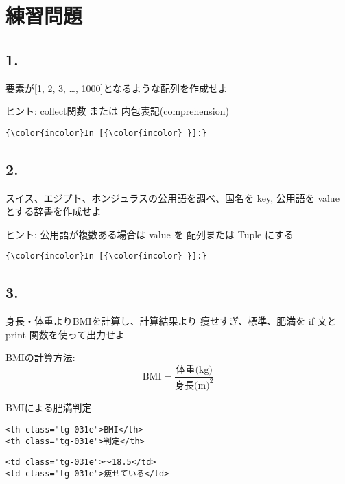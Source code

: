 \documentclass[a4paper,dvipdfmx,uplatex]{jsarticle}
\begin{document}
    \section{練習問題}\label{ux7df4ux7fd2ux554fux984c}

    \subsection{1.}\label{section}

要素が{[}1, 2, 3, \ldots{}, 1000{]}となるような配列を作成せよ

ヒント: collect関数 または 内包表記(comprehension)

    \begin{Verbatim}[commandchars=\\\{\}]
{\color{incolor}In [{\color{incolor} }]:} 
\end{Verbatim}

    \subsection{2.}\label{section}

スイス、エジプト、ホンジュラスの公用語を調べ、国名を key, 公用語を value
とする辞書を作成せよ

ヒント: 公用語が複数ある場合は value を 配列または Tuple にする

    \begin{Verbatim}[commandchars=\\\{\}]
{\color{incolor}In [{\color{incolor} }]:} 
\end{Verbatim}

    \subsection{3.}\label{section}

身長・体重よりBMIを計算し、計算結果より 痩せすぎ、標準、肥満を if
文とprint 関数を使って出力せよ

BMIの計算方法:
\[ \text{BMI} = \frac{\text{体重(kg)}}{\text{身長(m)}^2}\]

BMIによる肥満判定

\begin{verbatim}
<th class="tg-031e">BMI</th>
<th class="tg-031e">判定</th>
\end{verbatim}

\begin{verbatim}
<td class="tg-031e">〜18.5</td>
<td class="tg-031e">痩せている</td>
\end{verbatim}
\end{document}
